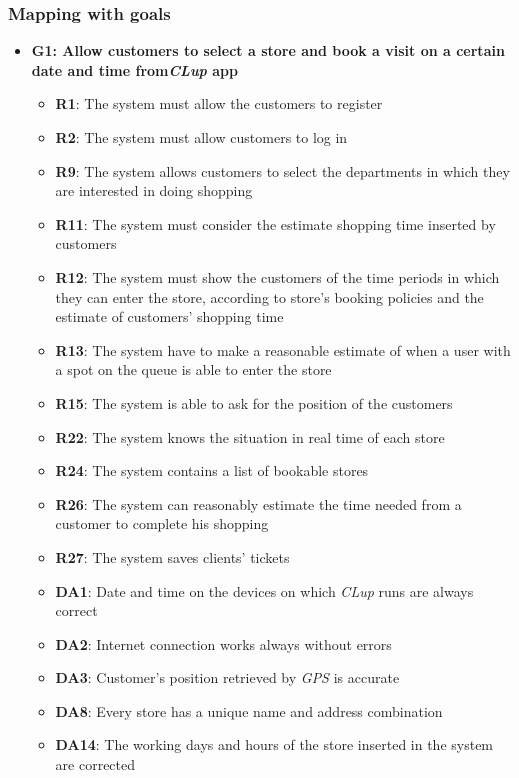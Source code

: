 \documentclass{article}
\begin{document}
		\subsubsection{Mapping with goals}
			
			\begin{itemize}			

				\item {\bfseries G1: Allow customers to select a store and book a visit on a certain date and time
				from\emph{CLup} app}			

					\begin{itemize}
						
						\item {\bfseries R1}: The system must allow the customers to register
						\item {\bfseries R2}: The system must allow customers to log in
						\item {\bfseries R9}: The system allows customers to select the departments in which they are interested in doing shopping						\item {\bfseries R11}: The system must consider the estimate shopping time inserted by customers
						\item {\bfseries R12}: The system must show the customers of the time periods in which they can enter the store, according to store's booking policies and the estimate of customers' shopping time
						\item {\bfseries R13}: The system have to make a reasonable estimate of when a user with a spot on the queue is able to enter the store
						\item {\bfseries R15}: The system is able to ask for the position of the customers
						\item {\bfseries R22}: The system knows the situation in real time of each store 
						\item {\bfseries R24}: The system contains a list of bookable stores
						\item {\bfseries R26}: The system can reasonably estimate the time needed from a customer to complete his shopping
						\item {\bfseries R27}: The system saves clients' tickets \\	
									
						\item {\bfseries DA1}: Date and time on the devices on which \emph{CLup} runs are always correct
						\item {\bfseries DA2}: Internet connection works always without errors
						\item {\bfseries DA3}: Customer’s position retrieved by \emph{GPS} is accurate
						\item {\bfseries DA8}: Every store has a unique name and address combination
						\item {\bfseries DA14}: The working days and hours of the store inserted in the system are corrected
					

\end{itemize}
\end{itemize}
\end{document}
